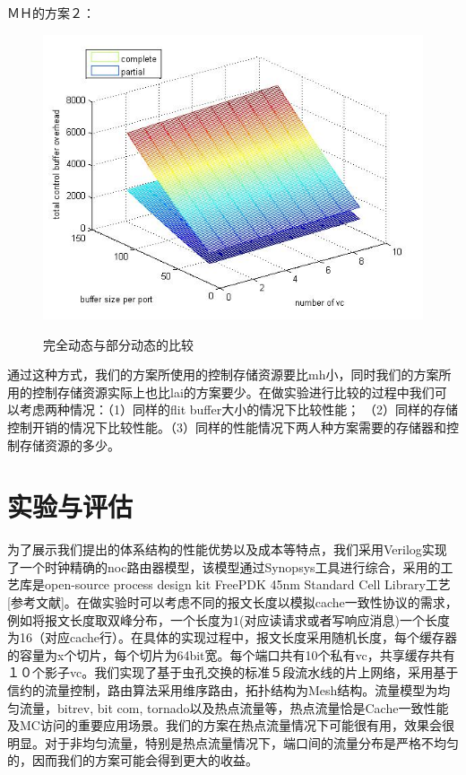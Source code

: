 ﻿\documentclass[10pt,journal]{IEEEtran}
\begin{document}
ＭＨ的方案２：

\begin{figure}
  \centering
  \includegraphics[scale=0.45]{figures/dynamic_vs_partial.jpg}\\
  \caption{完全动态与部分动态的比较}\label{comparions}
\end{figure}

通过这种方式，我们的方案所使用的控制存储资源要比mh小，同时我们的方案所用的控制存储资源实际上也比lai的方案要少。在做实验进行比较的过程中我们可以考虑两种情况：（1）同样的flit buffer大小的情况下比较性能； （2）同样的存储控制开销的情况下比较性能。（3）同样的性能情况下两人种方案需要的存储器和控制存储资源的多少。

\section{实验与评估}\label{experiemnts}
为了展示我们提出的体系结构的性能优势以及成本等特点，我们采用Verilog实现了一个时钟精确的noc路由器模型，该模型通过Synopsys工具进行综合，采用的工艺库是open-source process design kit FreePDK 45nm Standard Cell Library工艺[参考文献]。在做实验时可以考虑不同的报文长度以模拟cache一致性协议的需求，例如将报文长度取双峰分布，一个长度为1(对应读请求或者写响应消息)一个长度为16（对应cache行）。在具体的实现过程中，报文长度采用随机长度，每个缓存器的容量为x个切片，每个切片为64bit宽。每个端口共有10个私有vc，共享缓存共有１０个影子vc。我们实现了基于虫孔交换的标准５段流水线的片上网络，采用基于信约的流量控制，路由算法采用维序路由，拓扑结构为Mesh结构。流量模型为均匀流量，bitrev, bit com, tornado以及热点流量等，热点流量恰是Cache一致性能及MC访问的重要应用场景。我们的方案在热点流量情况下可能很有用，效果会很明显。对于非均匀流量，特别是热点流量情况下，端口间的流量分布是严格不均匀的，因而我们的方案可能会得到更大的收益。
\end{document}
